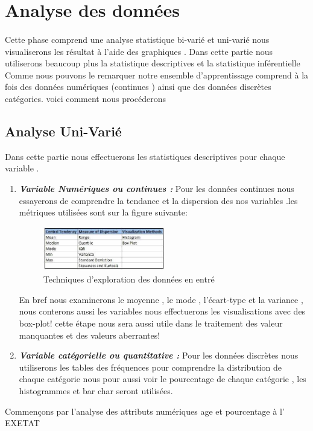  \section{Analyse des données}\label{analyse-des-donnuxe9es}
\paragraph{}
Cette phase comprend une analyse statistique bi-varié et uni-varié nous
visualiserons les résultat à l'aide des graphiques . Dans cette partie
nous utiliserons beaucoup plus la statistique descriptives et la statistique inférentielle
Comme nous  pouvons le remarquer notre ensemble d'apprentissage
comprend à la fois des données numériques (continues ) ainsi que des
données discrètes catégories. voici comment nous procéderons 
\subsection{Analyse Uni-Varié}
Dans cette partie nous effectuerons les statistiques descriptives pour chaque variable .
\begin{enumerate}
	\item
	\emph{\textbf{Variable Numériques ou continues : }}Pour les données continues nous
	essayerons de comprendre la tendance et la dispersion des nos
	variables .les métriques utilisées sont sur la figure suivante: 
	\begin{figure}[ht]
		\centering
		\includegraphics[width=0.5\textwidth]{fig/DataExploration.png}
		\caption[Short caption]{Techniques d'exploration des données en entré }
		\label{fig:DataExplora}
	\end{figure}
	En bref nous examinerons le moyenne , le mode , l'écart-type et la
	variance , nous conterons aussi les variables nous effectuerons  les
	visualisations avec des box-plot! cette étape nous sera aussi utile
	dans le traitement des valeur manquantes et des valeurs aberrantes!
	\item
	\emph{\textbf{Variable catégorielle ou quantitative :}} Pour les données discrètes nous
	 utiliserons  les tables des fréquences pour comprendre la distribution de
	chaque catégorie nous pour aussi voir le pourcentage de chaque
	catégorie , les histogrammes et bar char seront utilisées.
\end{enumerate}
Commençons par l'analyse des attributs numériques age et pourcentage à l' \ac{EXETAT} 
